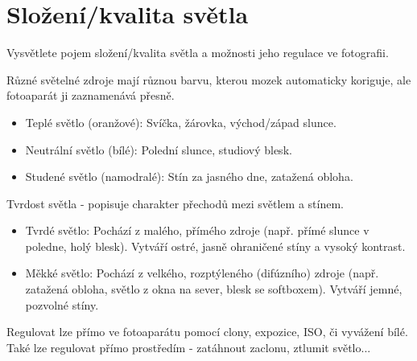 \section{Složení/kvalita světla}
Vysvětlete pojem složení/kvalita světla a možnosti jeho regulace ve fotografii.

Různé světelné zdroje mají různou barvu, kterou mozek automaticky koriguje, ale fotoaparát ji zaznamenává přesně.
\begin{itemize}
    \item Teplé světlo (oranžové): Svíčka, žárovka, východ/západ slunce.
    \item Neutrální světlo (bílé): Polední slunce, studiový blesk.
    \item Studené světlo (namodralé): Stín za jasného dne, zatažená obloha.
\end{itemize}

Tvrdost světla - popisuje charakter přechodů mezi světlem a stínem.
\begin{itemize}
    \item Tvrdé světlo: Pochází z malého, přímého zdroje (např. přímé slunce v poledne, holý blesk). Vytváří ostré, 
    jasně ohraničené stíny a vysoký kontrast.
    \item Měkké světlo: Pochází z velkého, rozptýleného (difúzního) zdroje (např. zatažená obloha, světlo z okna na 
    sever, blesk se softboxem). Vytváří jemné, pozvolné stíny.
\end{itemize}

Regulovat lze přímo ve fotoaparátu pomocí clony, expozice, ISO, či vyvážení bílé. Také lze regulovat přímo prostředím
- zatáhnout zaclonu, ztlumit světlo...
